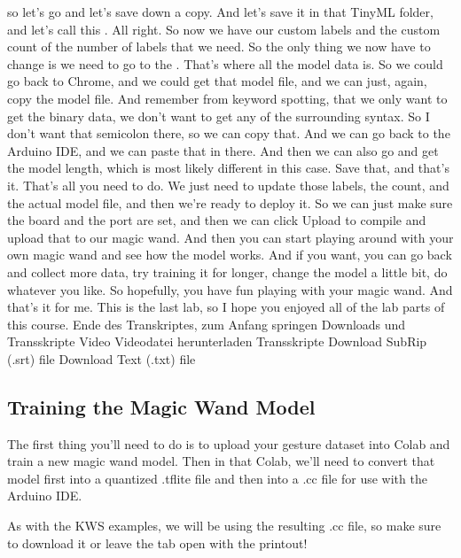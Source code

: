     so let's go and let's save down a copy.
    And let's save it in that TinyML folder, and let's call this .
    All right.
    So now we have our custom labels and the custom count of the number of labels
    that we need.
    So the only thing we now have to change is we need to go
    to the .
    That's where all the model data is.
    So we could go back to Chrome, and we could get that model file,
    and we can just, again, copy the model file.
    And remember from keyword spotting, that we only want to get the binary data,
    we don't want to get any of the surrounding syntax.
    So I don't want that semicolon there, so we can copy that.
    And we can go back to the Arduino IDE, and we can paste that in there.
    And then we can also go and get the model length, which
    is most likely different in this case.
    Save that, and that's it.
    That's all you need to do.
    We just need to update those labels, the count, and the actual model file,
    and then we're ready to deploy it.
    So we can just make sure the board and the port are set,
    and then we can click Upload to compile and upload that to our magic wand.
    And then you can start playing around with your own magic wand
    and see how the model works.
    And if you want, you can go back and collect more data,
    try training it for longer, change the model a little bit,
    do whatever you like.
    So hopefully, you have fun playing with your magic wand.
    And that's it for me.
    This is the last lab, so I hope you enjoyed
    all of the lab parts of this course.
    Ende des Transkriptes, zum Anfang springen
    Downloads und Transskripte
    Video
    Videodatei herunterladen
    Transskripte
    Download SubRip (.srt) file
    Download Text (.txt) file
    
\subsection{Training the Magic Wand Model}

    The first thing you’ll need to do is to upload your gesture dataset into Colab and train a new magic wand model. Then in that Colab, we’ll need to convert that model first into a quantized .tflite file and then into a .cc file for use with the Arduino IDE.
    
    As with the KWS examples, we will be using the resulting .cc file, so make sure to download it or leave the tab open with the printout!
    

